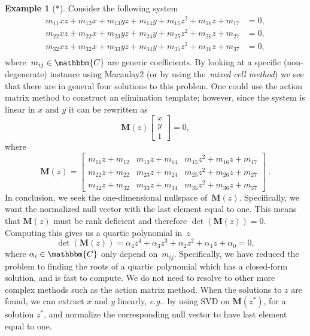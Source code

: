 \documentclass[11pt,a4paper]{article}
\makeatletter
\theoremstyle{definition}
\newtheorem{example}{Example}
\newcommand{\mat}[1]{\bm{#1}}
\newcommand{\C}{\ensuremath{\mathbbm{C}}}
\DeclareRobustCommand\eg{\emph{e.g}\@ifnextchar.{}{.\@}}
\makeatother
\begin{document}
\begin{example}[*]\label{ex:hidden2}
Consider the following system
\begin{equation}
\begin{aligned}
m_{11}xz + m_{12}x + m_{13}yz + m_{14}y + m_{15}z^2 + m_{16}z + m_{17} &= 0, \\
m_{22}xz + m_{22}x + m_{23}yz + m_{24}y + m_{25}z^2 + m_{26}z + m_{27} &= 0, \\
m_{32}xz + m_{32}x + m_{33}yz + m_{34}y + m_{35}z^2 + m_{36}z + m_{37} &= 0, \\
\end{aligned}
\end{equation}
where~$m_{ij}\in\C$ are generic coefficients.
By looking at a specific (non-degenerate) instance using Macaulay2
(or by using the~\emph{mixed cell method}) we see that there are in
general four solutions to this problem. One could use the action matrix method to construct an
elimination template; however, since the system is linear in $x$ and $y$ it can be rewritten as
\begin{equation}\label{eq:specialnullvector}
\mat{M}(z)
\begin{bmatrix}
x \\
y \\
1
\end{bmatrix}
= 0,
\end{equation}
where
\begin{equation}
\mat{M}(z)=
\begin{bmatrix}
    m_{11}z + m_{12} & m_{13}z + m_{14} & m_{15}z^2 + m_{16}z + m_{17} \\
    m_{22}z + m_{22} & m_{23}z + m_{24} & m_{25}z^2 + m_{26}z + m_{27} \\
    m_{32}z + m_{32} & m_{33}z + m_{34} & m_{35}z^2 + m_{36}z + m_{37}
\end{bmatrix}\;.
\end{equation}
In conclusion, we seek the one-dimensional nullspace of~$\mat{M}(z)$. Specifically, we want
the normalized null vector with the last element equal to one. This means that $\mat{M}(z)$ must
be rank deficient and therefore $\det(\mat{M}(z))=0$. Computing this gives us a
quartic polynomial in~$z$
\begin{equation}
    \det(\mat{M}(z)) =
    \alpha_4 z^4 +
    \alpha_3 z^3 +
    \alpha_2 z^2 +
    \alpha_1 z +
    \alpha_0 = 0,
\end{equation}
where $\alpha_i\in\C$ only depend on~$m_{ij}$. Specifically, we have reduced the problem to
finding the roots of a quartic polynomial which has a closed-form solution, and is fast to compute.
We do not need to resolve to other more complex methods such as the action matrix method.
When the solutions to $z$ are found, we can extract $x$ and $y$ linearly, \eg{} by using SVD
on $\mat{M}(z^*)$, for a solution $z^*$, and normalize the corresponding null vector to have
last element equal to one.
\end{example}
\end{document}
